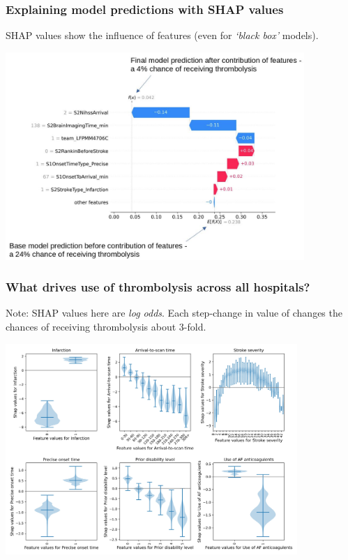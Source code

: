 \documentclass{beamer}
\begin{document}

\begin{frame}
\frametitle{Explaining model predictions with SHAP values}

SHAP values show the influence of features (even for \emph{`black box'} models).

\begin{center}
\includegraphics[width=0.85\textwidth]{./images/xgb_waterfall_low_probability.jpg}
\end{center}
\end{frame}



\begin{frame}
\frametitle{What drives use of thrombolysis across all hospitals?}

\footnotesize{Note: SHAP values here are \emph{log odds}. Each step-change in value of  changes the chances of receiving thrombolysis about 3-fold.}

\begin{center}
\includegraphics[width=0.83\textwidth]{./images/xgb_thrombolysis_shap_violin.jpg}
\end{center}
\end{frame}
\end{document}
